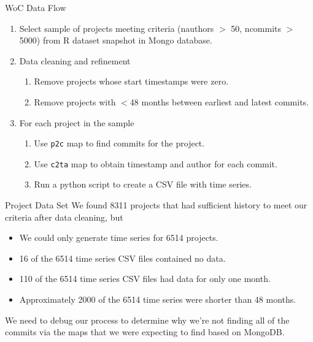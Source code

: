 \documentclass[11pt,handout]{beamer}
\begin{document}
\begin{frame}{WoC Data Flow}
    \begin{enumerate}
        \item Select sample of projects meeting criteria (nauthors $>$ 50, ncommits $>$ 5000) from R dataset snapshot in Mongo database.
        \item Data cleaning and refinement
            \begin{enumerate}
                \item Remove projects whose start timestamps were zero.
                \item Remove projects with $<$48 months between earliest and latest commits.
            \end{enumerate}
        \item For each project in the sample
            \begin{enumerate}
                \item Use \texttt{p2c} map to find commits for the project.
                \item Use \texttt{c2ta} map to obtain timestamp and author for each commit.
                \item Run a python script to create a CSV file with time series.
            \end{enumerate}
    \end{enumerate}
\end{frame}

\begin{frame}{Project Data Set}
We found 8311 projects that had sufficient history to meet our criteria after data cleaning, but
\begin{itemize}
    \item We could only generate time series for 6514 projects.
    \item 16 of the 6514 time series CSV files contained no data.
    \item 110 of the 6514 time series CSV files had data for only one month.
    \item Approximately 2000 of the 6514 time series were shorter than 48 months.
\end{itemize}
We need to debug our process to determine why we're not finding all of the commits via the maps that we were expecting to find based on MongoDB.
\end{frame}
\end{document}
